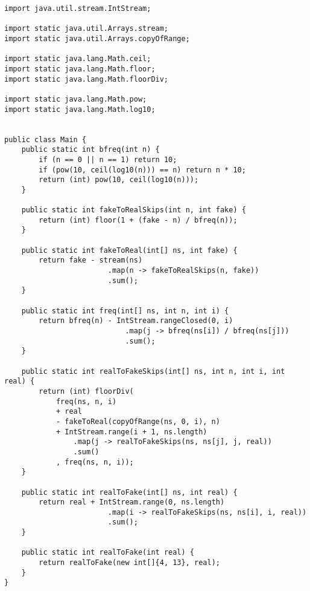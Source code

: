\documentclass{article}
\begin{document}
\begin{lstlisting}
import java.util.stream.IntStream;

import static java.util.Arrays.stream;
import static java.util.Arrays.copyOfRange;

import static java.lang.Math.ceil;
import static java.lang.Math.floor;
import static java.lang.Math.floorDiv;

import static java.lang.Math.pow;
import static java.lang.Math.log10;


public class Main {
    public static int bfreq(int n) {
        if (n == 0 || n == 1) return 10;
        if (pow(10, ceil(log10(n))) == n) return n * 10;
        return (int) pow(10, ceil(log10(n)));
    }

    public static int fakeToRealSkips(int n, int fake) {
        return (int) floor(1 + (fake - n) / bfreq(n));
    }

    public static int fakeToReal(int[] ns, int fake) {
        return fake - stream(ns)
                        .map(n -> fakeToRealSkips(n, fake))
                        .sum();
    }

    public static int freq(int[] ns, int n, int i) {
        return bfreq(n) - IntStream.rangeClosed(0, i)
                            .map(j -> bfreq(ns[i]) / bfreq(ns[j]))
                            .sum();
    }

    public static int realToFakeSkips(int[] ns, int n, int i, int real) {
        return (int) floorDiv(
            freq(ns, n, i) 
            + real 
            - fakeToReal(copyOfRange(ns, 0, i), n)
            + IntStream.range(i + 1, ns.length)
                .map(j -> realToFakeSkips(ns, ns[j], j, real))
                .sum()
            , freq(ns, n, i));
    }

    public static int realToFake(int[] ns, int real) {
        return real + IntStream.range(0, ns.length)
                        .map(i -> realToFakeSkips(ns, ns[i], i, real))
                        .sum();
    }

    public static int realToFake(int real) {
        return realToFake(new int[]{4, 13}, real);
    }
}
\end{lstlisting}
\end{document}
